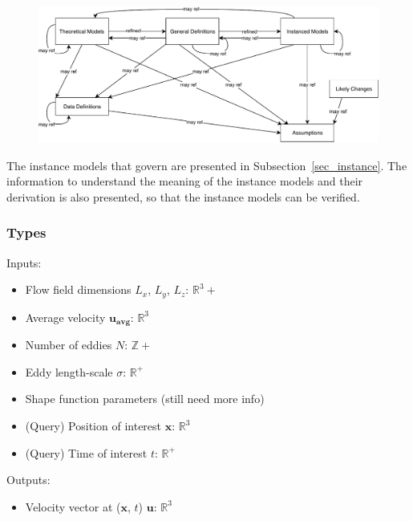 \documentclass[12pt]{article}
\begin{document}

\begin{figure}[H]
  \includegraphics[scale=0.9]{RelationsBetweenTM_GD_IM_DD_A.pdf}
\end{figure}

The instance models that govern \progname{} are presented in
Subsection~\ref{sec_instance}.  The information to understand the meaning of the
instance models and their derivation is also presented, so that the instance
models can be verified.

\subsubsection{Types}

Inputs:
\begin{itemize}
\item Flow field dimensions $L_x$, $L_y$, $L_z$: $\mathbb{R}^3+$
\item Average velocity $\mathbf{u_{\text{avg}}}$: $\mathbb{R}^3$
\item Number of eddies $N$: $\mathbb{Z}+$
\item Eddy length-scale $\sigma$: $\mathbb{R}^+$
\item Shape function parameters (still need more info)
\item (Query) Position of interest $\mathbf{x}$: $\mathbb{R}^3$
\item (Query) Time of interest $t$: $\mathbb{R}^+$
\end{itemize}

Outputs:
\begin{itemize}
\item Velocity vector at ($\mathbf{x}$, $t$) $\mathbf{u}$: $\mathbb{R}^3$
\end{itemize}
\end{document}
